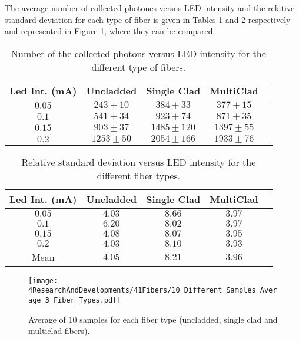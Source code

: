 The average number of collected photones versus LED intensity and the relative standard deviation for each type of fiber is given in Tables \ref{tab:10DifferentSamples} and \ref{tab:RelativeStandardDeviation3FiberTypes} respectively and represented in Figure \ref{fig:AveregeThreeFiberTypes}, where they can be compared. 

\begin{table}[h]
\begin{center}
\begin{tabular}{|c|c|c|c|c|}
\hline
Led Int. (mA) & Uncladded & Single Clad & MultiClad\\
\hline \hline \hline
$0.05$ & $243 \pm 10$ & $384 \pm 33$ & $377 \pm 15$ \\ \hline
$0.1$ & $541 \pm 34$ & $923 \pm 74$ & $871 \pm 35$ \\ \hline
$0.15$ & $903 \pm 37$ & $1485 \pm 120$ & $1397 \pm 55$ \\ \hline
$0.2$ & $1253 \pm 50$ & $2054 \pm 166$ & $1933 \pm 76$ \\ \hline
\end{tabular}
\caption{Number of the collected photons versus LED intensity for the different type of fibers.}
\label{tab:10DifferentSamples}
\end{center}
\end{table}

\begin{table}[h]
\begin{center}
\begin{tabular}{|c|c|c|c|c|}
\hline
Led Int. (mA) & Uncladded & Single Clad & MultiClad \\
\hline \hline \hline
$0.05$ & $4.03$ & $8.66$ & $3.97$ \\ \hline
$0.1$ & $6.20$ & $8.02$ & $3.97$ \\ \hline
$0.15$ & $4.08$ & $8.07$ & $3.95$ \\ \hline
$0.2$ & $4.03$ & $8.10$ & $3.93$ \\ \hline
Mean & $4.05$ & $8.21$ & $3.96$ \\ \hline
\end{tabular}
\caption{Relative standard deviation versus LED intensity for the different fiber types.}
\label{tab:RelativeStandardDeviation3FiberTypes}
\end{center}
\end{table}

\begin{figure}[h]
\centering
\texttt{[image: 4ResearchAndDevelopments/41Fibers/10\_Different\_Samples\_Average\_3\_Fiber\_Types.pdf]}
\caption{Average of 10 samples for each fiber type (uncladded, single clad and multiclad fibers).\label{fig:AveregeThreeFiberTypes}}
\end{figure}


